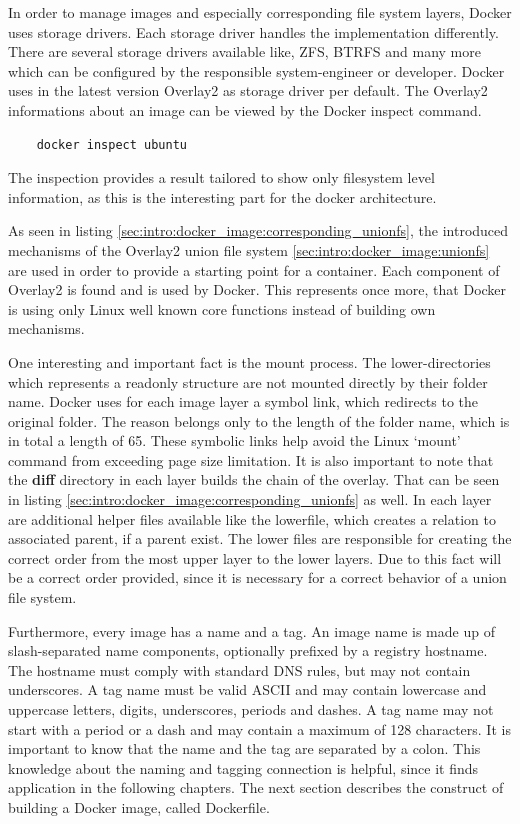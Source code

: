 In order to manage images and especially corresponding file system layers, Docker uses storage drivers. Each storage driver handles the implementation differently.
There are several storage drivers available like, ZFS, BTRFS and many more which can be configured by the responsible system-engineer or developer. Docker uses in the latest version Overlay2 as storage driver per default. The Overlay2 informations about an image can be viewed by the Docker inspect command.
\begin{lstlisting}
	docker inspect ubuntu
\end{lstlisting}

The inspection provides a result tailored to show only filesystem level information, as this is the interesting part for the docker architecture.
 


As seen in listing \ref{sec:intro:docker_image:corresponding_unionfs}, the introduced mechanisms of the Overlay2 union file system \ref{sec:intro:docker_image:unionfs} are used in order to provide a starting point for a container.
Each component of Overlay2 is found and is used by Docker. This represents once more, that Docker is using only Linux well known core functions instead of building own mechanisms.

One interesting and important fact is the mount process. The lower-directories which represents a readonly structure are not mounted directly by their folder name. Docker uses for each image layer a symbol link, which redirects to the original folder. The reason belongs only to the length of the folder name, which is in total a length of 65. These symbolic links help avoid the Linux ‘mount’ command from exceeding page size limitation.
It is also important to note that the \textbf{diff} directory in each layer builds the chain of the overlay. That can be seen in listing \ref{sec:intro:docker_image:corresponding_unionfs} as well. In each layer are additional helper files available like the lowerfile, which creates a relation to associated parent, if a parent exist.
The lower files are responsible for creating the correct order from the most upper layer to the lower layers. Due to this fact will be a correct order provided, since it is necessary for a correct behavior of a union file system.

Furthermore, every image has a name and a tag. An image name is made up of slash-separated name components, optionally prefixed by a registry hostname. The hostname must comply with standard DNS rules, but may not contain underscores. A tag name must be valid ASCII and may contain lowercase and uppercase letters, digits, underscores, periods and dashes. A tag name may not start with a period or a dash and may contain a maximum of 128 characters.
It is important to know that the name and the tag are separated by a colon.
This knowledge about the naming and tagging connection is helpful, since it finds application in the following chapters. The next section describes the construct of building a Docker image, called Dockerfile.

